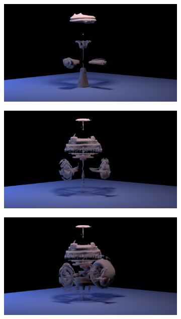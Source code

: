 \documentclass[11pt]{article}
\begin{document}
\begin{figure}
	\begin{subfigure}[h]{0.5\textwidth}
		\centering
		\includegraphics[width=\textwidth]{Figures/renders/plume0007.png}
	\end{subfigure}
	\begin{subfigure}[h]{0.5\textwidth}
		\centering
		\includegraphics[width=\textwidth]{Figures/renders/plume0008.png}	
	\end{subfigure}
	\begin{subfigure}[h]{0.5\textwidth}
		\centering
		\includegraphics[width=\textwidth]{Figures/renders/plume0009.png}

\end{subfigure}
\end{figure}
\end{document}
